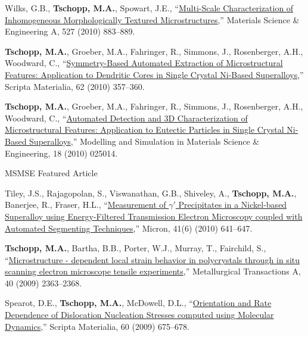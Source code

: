 \begin{cvlist}
\item 
Wilks, G.B., \textbf{Tschopp, M.A.}, Spowart, J.E., ``\href{http://dx.DOI.org/10.1016/j.msea.2009.09.003}{Multi-Scale Characterization of Inhomogeneous Morphologically Textured Microstructures},'' Materials Science \& Engineering A, 527 (2010) 883--889.

\item 
\textbf{Tschopp, M.A.}, Groeber, M.A., Fahringer, R., Simmons, J., Rosenberger, A.H., Woodward, C., ``\href{http://dx.DOI.org/10.1016/j.scriptamat.2009.10.038}{Symmetry-Based Automated Extraction of Microstructural Features: Application to Dendritic Cores in Single Crystal Ni-Based Superalloys},'' Scripta Materialia, 62 (2010) 357--360.

\item 
\textbf{Tschopp, M.A.}, Groeber, M.A., Fahringer, R., Simmons, J., Rosenberger, A.H., Woodward, C., ``\href{http://dx.DOI.org/10.1088/0965-0393/18/2/025014}{Automated Detection and 3D Characterization of Microstructural Features: Application to Eutectic Particles in Single Crystal Ni-Based Superalloys},'' Modelling and Simulation in Materials Science \& Engineering, 18 (2010) 025014.
\begin{list2}
\item[$\star$] {MSMSE Featured Article}
\end{list2}

\item
Tiley, J.S., Rajagopolan, S., Viswanathan, G.B., Shiveley, A., \textbf{Tschopp, M.A.}, Banerjee, R., Fraser, H.L., ``\href{http://dx.DOI.org/10.1016/j.micron.2010.03.003}{Measurement of $\gamma\prime$ Precipitates in a Nickel-based Superalloy using Energy-Filtered Transmission Electron Microscopy coupled with Automated Segmenting Techniques},'' Micron, 41(6) (2010) 641--647.

\item 
\textbf{Tschopp, M.A.}, Bartha, B.B., Porter, W.J., Murray, T., Fairchild, S., ``\href{http://dx.DOI.org/10.1007/s11661-009-9938-6}{Microstructure - dependent local strain behavior in polycrystals through in situ scanning electron microscope tensile experiments},'' Metallurgical Transactions A, 40 (2009) 2363--2368.

\item 
Spearot, D.E., \textbf{Tschopp, M.A.}, McDowell, D.L., ``\href{http://dx.DOI.org/10.1016/j.scriptamat.2008.12.037}{Orientation and Rate Dependence of Dislocation Nucleation Stresses computed using Molecular Dynamics},'' Scripta Materialia, 60 (2009) 675--678.


\end{cvlist}

